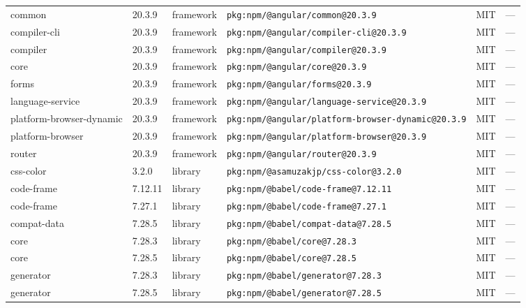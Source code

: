 \documentclass[11pt,a4paper]{article}
\begin{document}
\begin{longtable}{|p{4cm}|p{2cm}|p{1.6cm}|p{5cm}|p{1.5cm}|p{3.5cm}|}
\raggedright common & 20.3.9 & framework & \small\texttt{pkg:npm/@angular/common@20.3.9} & MIT & \small — \\
\raggedright compiler-cli & 20.3.9 & framework & \small\texttt{pkg:npm/@angular/compiler-cli@20.3.9} & MIT & \small — \\
\raggedright compiler & 20.3.9 & framework & \small\texttt{pkg:npm/@angular/compiler@20.3.9} & MIT & \small — \\
\raggedright core & 20.3.9 & framework & \small\texttt{pkg:npm/@angular/core@20.3.9} & MIT & \small — \\
\raggedright forms & 20.3.9 & framework & \small\texttt{pkg:npm/@angular/forms@20.3.9} & MIT & \small — \\
\raggedright language-service & 20.3.9 & framework & \small\texttt{pkg:npm/@angular/language-service@20.3.9} & MIT & \small — \\
\raggedright platform-browser-dynamic & 20.3.9 & framework & \small\texttt{pkg:npm/@angular/platform-browser-dynamic@20.3.9} & MIT & \small — \\
\raggedright platform-browser & 20.3.9 & framework & \small\texttt{pkg:npm/@angular/platform-browser@20.3.9} & MIT & \small — \\
\raggedright router & 20.3.9 & framework & \small\texttt{pkg:npm/@angular/router@20.3.9} & MIT & \small — \\
\raggedright css-color & 3.2.0 & library & \small\texttt{pkg:npm/@asamuzakjp/css-color@3.2.0} & MIT & \small — \\
\raggedright code-frame & 7.12.11 & library & \small\texttt{pkg:npm/@babel/code-frame@7.12.11} & MIT & \small — \\
\raggedright code-frame & 7.27.1 & library & \small\texttt{pkg:npm/@babel/code-frame@7.27.1} & MIT & \small — \\
\raggedright compat-data & 7.28.5 & library & \small\texttt{pkg:npm/@babel/compat-data@7.28.5} & MIT & \small — \\
\raggedright core & 7.28.3 & library & \small\texttt{pkg:npm/@babel/core@7.28.3} & MIT & \small — \\
\raggedright core & 7.28.5 & library & \small\texttt{pkg:npm/@babel/core@7.28.5} & MIT & \small — \\
\raggedright generator & 7.28.3 & library & \small\texttt{pkg:npm/@babel/generator@7.28.3} & MIT & \small — \\
\raggedright generator & 7.28.5 & library & \small\texttt{pkg:npm/@babel/generator@7.28.5} & MIT & \small — \\

\end{longtable}
\end{document}

